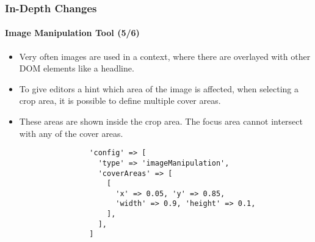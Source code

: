 
\begin{frame}[fragile]
	\frametitle{In-Depth Changes}
	\framesubtitle{Image Manipulation Tool (5/6)}

	\lstset{basicstyle=\tiny\ttfamily}

	\begin{itemize}
		\item Very often images are used in a context, where there are overlayed with other DOM elements like a headline.
		\item To give editors a hint which area of the image is affected, when selecting a crop area,
			it is possible to define multiple cover areas.
		\item These areas are shown inside the crop area. The focus area cannot intersect with any of the cover areas.

			\begin{lstlisting}
				'config' => [
				  'type' => 'imageManipulation',
				  'coverAreas' => [
				    [
				      'x' => 0.05, 'y' => 0.85,
				      'width' => 0.9, 'height' => 0.1,
				    ],
				  ],
				]
			\end{lstlisting}

	\end{itemize}

\end{frame}


